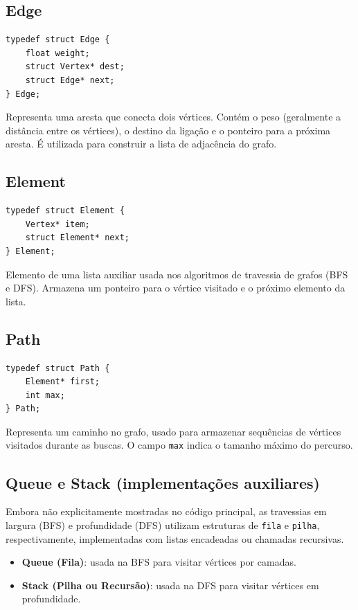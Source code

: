 \documentclass[a4paper,12pt]{article}
\begin{document}
\subsection{Edge}
\begin{lstlisting}[style=CStyle]
typedef struct Edge {
    float weight;
    struct Vertex* dest;
    struct Edge* next;
} Edge;
\end{lstlisting}
Representa uma aresta que conecta dois vértices. Contém o peso (geralmente a distância entre os vértices), o destino da ligação e o ponteiro para a próxima aresta. É utilizada para construir a lista de adjacência do grafo.

\subsection{Element}
\begin{lstlisting}[style=CStyle]
typedef struct Element {
    Vertex* item;
    struct Element* next;
} Element;
\end{lstlisting}
Elemento de uma lista auxiliar usada nos algoritmos de travessia de grafos (BFS e DFS). Armazena um ponteiro para o vértice visitado e o próximo elemento da lista.

\subsection{Path}
\begin{lstlisting}[style=CStyle]
typedef struct Path {
    Element* first;
    int max;
} Path;
\end{lstlisting}
Representa um caminho no grafo, usado para armazenar sequências de vértices visitados durante as buscas. O campo \texttt{max} indica o tamanho máximo do percurso.

\subsection{Queue e Stack (implementações auxiliares)}
Embora não explicitamente mostradas no código principal, as travessias em largura (BFS) e profundidade (DFS) utilizam estruturas de \texttt{fila} e \texttt{pilha}, respectivamente, implementadas com listas encadeadas ou chamadas recursivas.

\begin{itemize}
    \item \textbf{Queue (Fila)}: usada na BFS para visitar vértices por camadas.
    \item \textbf{Stack (Pilha ou Recursão)}: usada na DFS para visitar vértices em profundidade.
\end{itemize}
\end{document}
